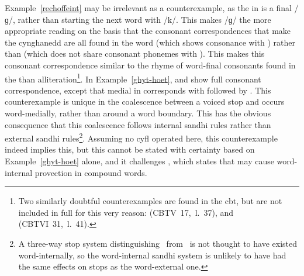 Example~\ref{rechoffeint}  may be irrelevant as a counterexample, as the  in  is a final /ɡ/, rather than starting the next word with /k/. This makes /ɡ/  the more appropriate reading on the basis that the consonant correspondences that make the cynghanedd are all found in the word  (which shows consonance with ) rather than  (which does not share consonant phonemes with ). This makes this consonant correspondence similar to the rhyme of word-final consonants found in the  than alliteration\footnote{Two similarly doubtful counterexamples are found in the \gls{cbt}, but are not included in full for this very reason:  (\acrshort{CBTV}~17,~l.~37), and  (\acrshort{CBTVI}~31,~l.~41).}. 
In Example~\ref{ghyt-hoet},  and  show full consonant correspondence, except that medial  in  corresponds with  followed by . This counterexample is unique in the coalescence between a voiced stop and  occurs word-medially, rather than around a word boundary. This has the obvious consequence that this coalescence follows internal sandhi rules rather than external sandhi rules\footnote{A three-way stop system distinguishing \xD\ from \lT\ is not thought to have existed word-internally, so the word-internal sandhi system is unlikely to have had the same effects on stops as the word-external one.}.  Assuming no \gls{cyfl} operated here, this counterexample indeed implies this, but this cannot be stated with certainty based on Example~\ref{ghyt-hoet} alone, and it challenges \textcite[§~17b]{evans_grammar_1964}, which states that  may cause word-internal provection in compound words. %


